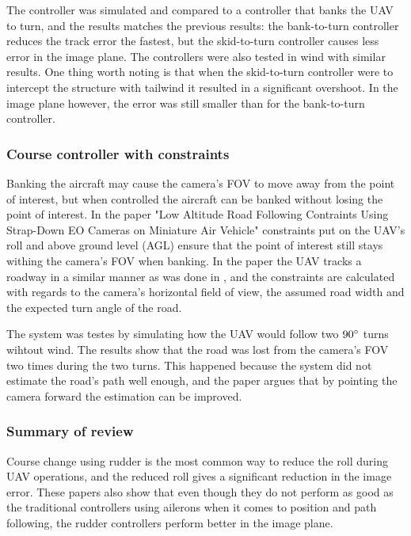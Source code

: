 The controller was simulated and compared to a controller that banks the UAV to turn, and the results matches the previous results: the bank-to-turn controller reduces the track error the fastest, but the skid-to-turn controller causes less error in the image plane. The controllers were also tested in wind with similar results. One thing worth noting is that when the skid-to-turn controller were to intercept the structure with tailwind it resulted in a significant overshoot. In the image plane however, the error was still smaller than for the bank-to-turn controller.


\subsubsection{Course controller with constraints}

Banking the aircraft may cause the camera's FOV to move away from the point of interest, but when controlled the aircraft can be banked without losing the point of interest. In the paper "Low Altitude Road Following Contraints Using Strap-Down EO Cameras on Miniature Air Vehicle" \cite{constraintsEGBERT} constraints put on the UAV's roll and above ground level (AGL) ensure that the point of interest still stays withing the camera's FOV when banking. In the paper the UAV tracks a roadway in a similar manner as was done in \cite{skidToTurnMills}, and the constraints are calculated with regards to the camera's horizontal field of view, the assumed road width and the expected turn angle of the road.


The system was testes by simulating how the UAV would follow two $90\degree$ turns wihtout wind. The results show that the road was lost from the camera's FOV two times during the two turns. This happened because the system did not estimate the road's path well enough, and the paper argues that by pointing the camera forward the estimation can be improved.


\subsubsection{Summary of review}
Course change using rudder is the most common way to reduce the roll during UAV operations, and the reduced roll gives a significant reduction in the image error. These papers also show that even though they do not perform as good as the traditional controllers using ailerons when it comes to position and path following, the rudder controllers perform better in the image plane.

